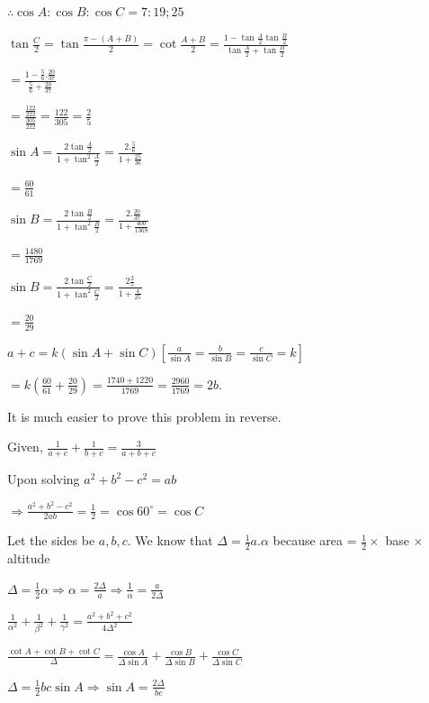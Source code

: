   $\therefore \cos A:\cos B:\cos C = 7:19;25$

\item $\tan \frac{C}{2} = \tan\frac{\pi - (A + B)}{2} = \cot\frac{A + B}{2} = \frac{1 -
  \tan\frac{A}{2}\tan\frac{B}{2}}{\tan\frac{A}{2} + \tan\frac{B}{2}}$

  $= \frac{1 - \frac{5}{6}.\frac{20}{37}}{\frac{5}{6} + \frac{20}{37}}$

  $= \frac{\frac{122}{222}}{\frac{305}{222}} = \frac{122}{305} = \frac{2}{5}$

  $\sin A = \frac{2\tan\frac{A}{2}}{1 + \tan^2\frac{A}{2}} = \frac{2.\frac{5}{6}}{1 + \frac{25}{36}}$

  $= \frac{60}{61}$

  $\sin B = \frac{2\tan\frac{B}{2}}{1 + \tan^2\frac{B}{2}} = \frac{2.\frac{20}{37}}{1 + \frac{400}{1369}}$

  $= \frac{1480}{1769}$

  $\sin B = \frac{2\tan\frac{C}{2}}{1 + \tan^2\frac{C}{2}} = \frac{2\frac{2}{5}}{1 + \frac{4}{25}}$

  $= \frac{20}{29}$

  $a + c = k(\sin A + \sin C)[\frac{a}{\sin A} = \frac{b}{\sin B} = \frac{c}{\sin C} = k]$

  $= k\left(\frac{60}{61} + \frac{20}{29}\right) = \frac{1740 + 1220}{1769} = \frac{2960}{1769} = 2b.$

\item It is much easier to prove this problem in reverse.

  Given, $\frac{1}{a + c} + \frac{1}{b + c} = \frac{3}{a + b + c}$

  Upon solving $a^2 + b^2 - c^2 = ab$

  $\Rightarrow \frac{a^2 + b^2 - c^2}{2ab} = \frac{1}{2} = \cos60^\circ = \cos C$

\item Let the sides be $a, b, c.$ We know that $\Delta = \frac{1}{2}a.\alpha$ because area = $\frac{1}{2}\times$ base $\times$ altitude

  $\Delta = \frac{1}{2}\alpha \Rightarrow \alpha = \frac{2\Delta}{a} \Rightarrow \frac{1}{\alpha} = \frac{a}{2\Delta}$

  $\frac{1}{\alpha^2} + \frac{1}{\beta^2} + \frac{1}{\gamma^2} = \frac{a^2 + b^2 + c^2}{4\Delta^2}$

  $\frac{\cot A + \cot B + \cot C}{\Delta} = \frac{\cos A}{\Delta\sin A} + \frac{\cos B}{\Delta\sin B} + \frac{\cos
  C}{\Delta\sin C}$

  $\Delta = \frac{1}{2}bc\sin A \Rightarrow \sin A = \frac{2\Delta}{bc}$


